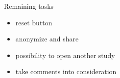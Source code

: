 
Remaining tasks 

\begin{itemize}
	\item reset button
	\item anonymize and share 
	\item possibility to open another study 
	\item take comments into consideration

\end{itemize}